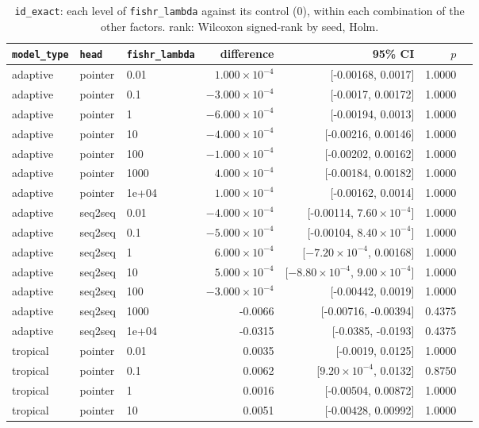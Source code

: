 \documentclass[10pt]{article}
\begin{document}
{\small
\begin{longtable}{lllrrrl}
\caption{\texttt{id\_exact}: each level of \texttt{fishr\_lambda} against its control (0), within each combination of the other factors. rank: Wilcoxon signed-rank by seed, Holm.}\label{tab:control-id_exact}\\
\toprule
\texttt{model\_type} & \texttt{head} & \texttt{fishr\_lambda} & difference & 95\% CI & $p$ & \\
\midrule
\endhead
adaptive & pointer & 0.01 & $1.000\times10^{-4}$ & [-0.00168, 0.0017] & 1.0000 & \\
adaptive & pointer & 0.1 & $-3.000\times10^{-4}$ & [-0.0017, 0.00172] & 1.0000 & \\
adaptive & pointer & 1 & $-6.000\times10^{-4}$ & [-0.00194, 0.0013] & 1.0000 & \\
adaptive & pointer & 10 & $-4.000\times10^{-4}$ & [-0.00216, 0.00146] & 1.0000 & \\
adaptive & pointer & 100 & $-1.000\times10^{-4}$ & [-0.00202, 0.00162] & 1.0000 & \\
adaptive & pointer & 1000 & $4.000\times10^{-4}$ & [-0.00184, 0.00182] & 1.0000 & \\
adaptive & pointer & 1e+04 & $1.000\times10^{-4}$ & [-0.00162, 0.0014] & 1.0000 & \\
adaptive & seq2seq & 0.01 & $-4.000\times10^{-4}$ & [-0.00114, $7.60\times10^{-4}$] & 1.0000 & \\
adaptive & seq2seq & 0.1 & $-5.000\times10^{-4}$ & [-0.00104, $8.40\times10^{-4}$] & 1.0000 & \\
adaptive & seq2seq & 1 & $6.000\times10^{-4}$ & [$-7.20\times10^{-4}$, 0.00168] & 1.0000 & \\
adaptive & seq2seq & 10 & $5.000\times10^{-4}$ & [$-8.80\times10^{-4}$, $9.00\times10^{-4}$] & 1.0000 & \\
adaptive & seq2seq & 100 & $-3.000\times10^{-4}$ & [-0.00442, 0.0019] & 1.0000 & \\
adaptive & seq2seq & 1000 & -0.0066 & [-0.00716, -0.00394] & 0.4375 & \\
adaptive & seq2seq & 1e+04 & -0.0315 & [-0.0385, -0.0193] & 0.4375 & \\
tropical & pointer & 0.01 & 0.0035 & [-0.0019, 0.0125] & 1.0000 & \\
tropical & pointer & 0.1 & 0.0062 & [$9.20\times10^{-4}$, 0.0132] & 0.8750 & \\
tropical & pointer & 1 & 0.0016 & [-0.00504, 0.00872] & 1.0000 & \\
tropical & pointer & 10 & 0.0051 & [-0.00428, 0.00992] & 1.0000 & \\

\end{longtable}}
\end{document}
